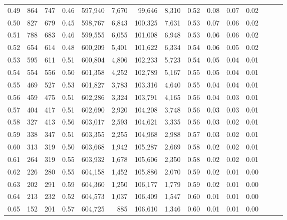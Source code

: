 \begin{tabular}{rrrrrrrrrrrrrrr}
0.49 &     864 &    747 &  0.46 &  597,940 &    7,670 &   99,646 &    8,310 &  0.52 &  0.08 &  0.07 &      0.02 \\
0.50 &     827 &    679 &  0.45 &  598,767 &    6,843 &  100,325 &    7,631 &  0.53 &  0.07 &  0.06 &      0.02 \\
0.51 &     788 &    683 &  0.46 &  599,555 &    6,055 &  101,008 &    6,948 &  0.53 &  0.06 &  0.06 &      0.02 \\
0.52 &     654 &    614 &  0.48 &  600,209 &    5,401 &  101,622 &    6,334 &  0.54 &  0.06 &  0.05 &      0.02 \\
0.53 &     595 &    611 &  0.51 &  600,804 &    4,806 &  102,233 &    5,723 &  0.54 &  0.05 &  0.04 &      0.01 \\
0.54 &     554 &    556 &  0.50 &  601,358 &    4,252 &  102,789 &    5,167 &  0.55 &  0.05 &  0.04 &      0.01 \\
0.55 &     469 &    527 &  0.53 &  601,827 &    3,783 &  103,316 &    4,640 &  0.55 &  0.04 &  0.04 &      0.01 \\
0.56 &     459 &    475 &  0.51 &  602,286 &    3,324 &  103,791 &    4,165 &  0.56 &  0.04 &  0.03 &      0.01 \\
0.57 &     404 &    417 &  0.51 &  602,690 &    2,920 &  104,208 &    3,748 &  0.56 &  0.03 &  0.03 &      0.01 \\
0.58 &     327 &    413 &  0.56 &  603,017 &    2,593 &  104,621 &    3,335 &  0.56 &  0.03 &  0.02 &      0.01 \\
0.59 &     338 &    347 &  0.51 &  603,355 &    2,255 &  104,968 &    2,988 &  0.57 &  0.03 &  0.02 &      0.01 \\
0.60 &     313 &    319 &  0.50 &  603,668 &    1,942 &  105,287 &    2,669 &  0.58 &  0.02 &  0.02 &      0.01 \\
0.61 &     264 &    319 &  0.55 &  603,932 &    1,678 &  105,606 &    2,350 &  0.58 &  0.02 &  0.02 &      0.01 \\
0.62 &     226 &    280 &  0.55 &  604,158 &    1,452 &  105,886 &    2,070 &  0.59 &  0.02 &  0.01 &      0.00 \\
0.63 &     202 &    291 &  0.59 &  604,360 &    1,250 &  106,177 &    1,779 &  0.59 &  0.02 &  0.01 &      0.00 \\
0.64 &     213 &    232 &  0.52 &  604,573 &    1,037 &  106,409 &    1,547 &  0.60 &  0.01 &  0.01 &      0.00 \\
0.65 &     152 &    201 &  0.57 &  604,725 &      885 &  106,610 &    1,346 &  0.60 &  0.01 &  0.01 &      0.00 \\

\end{tabular}
